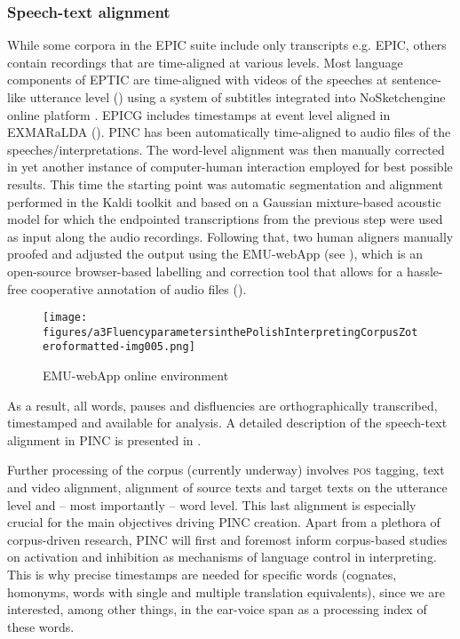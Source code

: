 \documentclass[output=paper]{langscibook}
\begin{document}
\subsubsection{Speech-text alignment}\label{sec:chmiel:2.2.3}


While some corpora in the EPIC suite include only transcripts e.g. EPIC, others contain recordings that are time-aligned at various levels. Most language components of EPTIC are time-aligned with videos of the speeches at sentence-like utterance level (\citealt[132]{FerraresiBernardini2019}) using a system of subtitles integrated into NoSketchengine online platform \citep{Rychly2007}. EPICG includes timestamps at event level aligned in EXMARaLDA (\citealt{SchmidtWoerner2009}). PINC has been automatically time-aligned to audio files of the speeches/interpretations. The word-level alignment was then manually corrected in yet another instance of computer-human interaction employed for best possible results. This time the starting point was automatic segmentation and alignment performed in the Kaldi toolkit \citep{PoveyEtAl2011} and based on a Gaussian mixture-based acoustic model for which the endpointed transcriptions from the previous step were used as input along the audio recordings. Following that, two human aligners manually proofed and adjusted the output using the EMU-webApp (see ), which is an open-source browser-based labelling and correction tool that allows for a hassle-free cooperative annotation of audio files (\citealt{WinkelmannRaess2014}).

  
 \begin{figure}

\texttt{[image: figures/a3FluencyparametersinthePolishInterpretingCorpusZoteroformatted-img005.png]}
 

\caption{
EMU-webApp online environment
}
\label{fig:chmiel:5}
\end{figure}

As a result, all words, pauses and disfluencies are orthographically transcribed, timestamped and available for analysis. A detailed description of the speech-text alignment in PINC is presented in \citet{Korzinek2020Seg}.

Further processing of the corpus (currently underway) involves \textsc{pos} tagging, text and video alignment, alignment of source texts and target texts on the utterance level and – most importantly – word level. This last alignment is especially crucial for the main objectives driving PINC creation. Apart from a plethora of corpus-driven research, PINC will first and foremost inform corpus-based studies on activation and inhibition as mechanisms of language control in interpreting. This is why precise timestamps are needed for specific words (cognates, homonyms, words with single and multiple translation equivalents), since we are interested, among other things, in the ear-voice span as a processing index of these words. 
\end{document}
